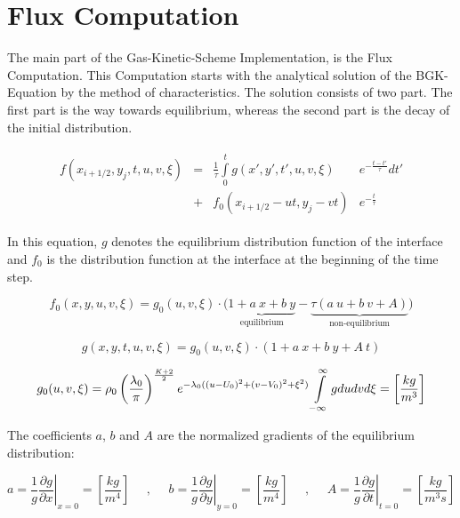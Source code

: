 \documentclass[
	pdftex,             %
	12pt,				%
	a4paper,		   	%
	english,				%
	oneside,			%
]{article}
\begin{document}
\section{Flux Computation}

The main part of the Gas-Kinetic-Scheme Implementation, is the Flux Computation. This Computation starts with the analytical solution of the BGK-Equation by the method of characteristics. The solution consists of two part. The first part is the way towards equilibrium, whereas the second part is the decay of the initial distribution. 

\begin{equation}
\begin{split}
\begin{array}{lcll}
f(x_{i+1/2}, y_j, t,u,v,\xi) 
&=&
 \frac{1}{\tau} \int \limits_0^t
g(x', y', t', u, v, \xi) &e^{-\tfrac{t-t'}{\tau}} dt'
\\
&+& f_0(x_{i+1/2} - ut, y_j - vt) &e^{-\tfrac{t}{\tau}}
\end{array}
\end{split}
\end{equation}

In this equation, $g$ denotes the equilibrium distribution function of the interface and $f_0$ is the distribution function at the interface at the beginning of the time step. 

\begin{equation}
f_0(x,y,u,v,\xi) = g_0(u,v,\xi) \cdot
\Big( 
\underbrace{ 1 + a~x + b~y }_{\text{equilibrium}}
-
\underbrace{ \tau \left( a~u + b~v + A \right) }_{\text{non-equilibrium}}
\Big)
\end{equation}

\begin{equation}
g(x,y,t,u,v,\xi) = g_0(u,v,\xi) \cdot \left( 1 + a~x + b~y + A~t \right)
\end{equation}

\begin{equation}
g_0(u,v,\xi) = \rho_0 \left( \frac{\lambda_0}{\pi} \right)^{\frac{K+2}{2}}
           e^{-\lambda_0 ((u-U_0)^2 + (v-V_0)^2 + \xi^2)}
\hfill
\int \limits_{-\infty}^{\infty} g dudvd\xi = \left[ \dfrac{kg}{m^3} \right]
\end{equation}

The coefficients $a$, $b$ and $A$ are the normalized gradients of the equilibrium distribution:

\begin{equation}
a = \left. \frac{1}{g} \frac{\partial g}{\partial x} \right|_{x=0}
= \left[ \dfrac{kg}{m^4} \right]
~~~~~~,~~~~~~
b = \left. \frac{1}{g} \frac{\partial g}{\partial y} \right|_{y=0}
= \left[ \dfrac{kg}{m^4} \right] 
~~~~~~,~~~~~~
A = \left. \frac{1}{g} \frac{\partial g}{\partial t} \right|_{t=0}
= \left[ \dfrac{kg}{m^3 s} \right]
\end{equation}
\end{document}
